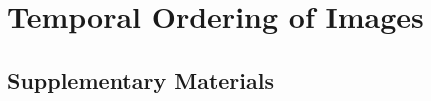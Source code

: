 \chapter{Temporal Ordering of Images \label{app:drosophila}}

\graphicspath{{ch-drosophila/figures/}}

\section{Supplementary Materials}



